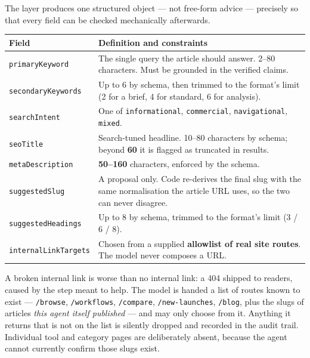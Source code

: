 \documentclass[11pt,a4paper]{article}
\newcommand{\brk}{\hyphenpenalty=0\exhyphenpenalty=0\relax}
\newcommand{\code}[1]{\texttt{\small\brk #1}}
\begin{document}
The layer produces one structured object --- not free-form advice --- precisely so
that every field can be checked mechanically afterwards.

\begin{center}
\small
\begin{tabularx}{\textwidth}{@{}l >{\RaggedRight}X@{}}
\toprule
\textbf{Field} & \textbf{Definition and constraints} \\
\midrule
\code{primaryKeyword} & The single query the article should answer. 2--80
  characters. Must be grounded in the verified claims. \\
\code{secondaryKeywords} & Up to 6 by schema, then trimmed to the format's limit
  (2 for a brief, 4 for standard, 6 for analysis). \\
\code{searchIntent} & One of \code{informational}, \code{commercial},
  \code{navigational}, \code{mixed}. \\
\code{seoTitle} & Search-tuned headline. 10--80 characters by schema; beyond
  \textbf{60} it is flagged as truncated in results. \\
\code{metaDescription} & \textbf{50--160} characters, enforced by the schema. \\
\code{suggestedSlug} & A proposal only. Code re-derives the final slug with the
  same normalisation the article URL uses, so the two can never disagree. \\
\code{suggestedHeadings} & Up to 8 by schema, trimmed to the format's limit
  (3 / 6 / 8). \\
\code{internalLinkTargets} & Chosen from a supplied \textbf{allowlist of real site
  routes}. The model never composes a URL. \\
\bottomrule
\end{tabularx}
\end{center}

\begin{infobox}
A broken internal link is worse than no internal link: a 404 shipped to readers,
caused by the step meant to help. The model is handed a list of routes known to
exist --- \code{/browse}, \code{/workflows}, \code{/compare}, \code{/new-launches},
\code{/blog}, plus the slugs of articles \emph{this agent itself published} --- and
may only choose from it. Anything it returns that is not on the list is silently
dropped and recorded in the audit trail. Individual tool and category pages are
deliberately absent, because the agent cannot currently confirm those slugs exist.
\end{infobox}
\end{document}
